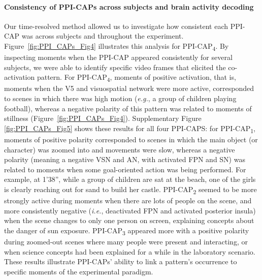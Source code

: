 \paragraph{Consistency of PPI-CAPs across subjects and brain activity decoding} Our time-resolved method allowed us to investigate how consistent each PPI-CAP was across subjects and throughout the experiment. Figure~\ref{fig:PPI_CAPs_Fig4} illustrates this analysis for PPI-CAP\textsubscript{4}. By inspecting moments when the PPI-CAP appeared consistently for several subjects, we were able to identify specific video frames that elicited the co-activation pattern. For PPI-CAP\textsubscript{4},  moments of positive activation, that is, moments when the V5 and visuospatial network were more active, corresponded to scenes in which there was high motion (\textit{e.g.}, a group of children playing football), whereas a negative polarity of this pattern was related to moments of stillness (Figure~\ref{fig:PPI_CAPs_Fig4}).
Supplementary Figure \ref{fig:PPI_CAPs_Fig5} shows these results for all four PPI-CAPS: for PPI-CAP\textsubscript{1}, moments of positive polarity corresponded to scenes in which the main object (or character) was zoomed into and movements were slow, whereas a negative polarity (meaning a negative VSN and AN, with activated FPN and SN) was related to moments when some goal-oriented action was being performed. For example, at 1'38'', while a group of children are sat at the beach, one of the girls is clearly reaching out for sand to build her castle.   PPI-CAP\textsubscript{2} seemed to be more strongly active during moments when there are lots of people on the scene, and more consistently negative (\textit{i.e.}, deactivated FPN and activated posterior insula) when the scene changes to only one person on screen, explaining concepts about the danger of sun exposure. PPI-CAP\textsubscript{3} appeared more with a positive polarity during zoomed-out scenes where many people were present and interacting, or when science concepts had been explained for a while in the laboratory scenario. These results illustrate PPI-CAPs' ability to link a pattern's occurrence to specific moments of the experimental paradigm.


